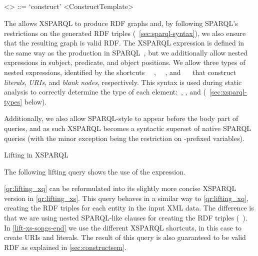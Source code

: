 \subsection{\ConstructClause}
\label{sec:constructclause-syntax}
%
{\scriptsize 
  \begin{grammar}
    <\textbf{\ConstructClause}> ::= `construct' <ConstructTemplate>
  \end{grammar}
  \vspace{-.5\grammarparsep}%
}
%
\noindent The \ConstructClause allows XSPARQL to produce \ac{RDF} graphs and, by following SPARQL's restrictions on the
generated \ac{RDF} triples (\cf~\cref{sec:sparql-syntax}), we also ensure that the resulting graph is valid
\ac{RDF}.
%
The XSPARQL \synt{\ConstructTemplate} expression is defined in the same way as the production \synt{\ConstructTemplate}
in SPARQL~\cite{PrudhommeauxSeaborne:2008aa}, but we additionally allow nested \synt{\XSPARQLFLWORExpr} expressions in
subject, predicate, and object positions.
%
\noindent We allow three types of nested expressions, identified by the shortcuts
\lit{\textbraceleft}~\synt{\XSPARQLFLWORExpr}~\lit{\textbraceright},
\lit{<\textbraceleft}~\synt{\XSPARQLFLWORExpr}~\lit{\textbraceright>}, and
\lit{\_:\textbraceleft}~\synt{\XSPARQLFLWORExpr}~\lit{\textbraceright} that construct \emph{literals}, \emph{URIs}, and
\emph{blank nodes}, respectively.
%
This syntax is used during static analysis to correctly determine the type of each element:~,
, and  (\cf~\cref{sec:xsparql-types} below).

Additionally, we also allow SPARQL-style  to appear before the body part of queries, and as such
XSPARQL becomes a syntactic superset of native SPARQL \CONSTRUCT queries (with the minor exception being the restriction
on -prefixed variables).


\begin{query}
  \caption{Lifting in XSPARQL}%
  \label{qr:lifting_xs}%
\end{query}
%
The following lifting query shows the use of the \ConstructClause expression.
%
\begin{example}
  \cref{qr:lifting_xq} can be reformulated into its slightly more concise XSPARQL version in \cref{qr:lifting_xs}.
  This query behaves in a similar way to \cref{qr:lifting_xq}, creating the \ac{RDF} triples for each entity in the
  input \ac{XML} data.  The difference is that we are using nested SPARQL-like \CONSTRUCT clauses for creating the
  \ac{RDF} triples (\cf~).
  In \cref{lift-xs-songs-end} we use the different XSPARQL shortcuts, in this case to create \acp{URI} and literals.
  The result of this query is also guaranteed to be valid \ac{RDF} as explained in \cref{sec:constructsem}.
\end{example}


